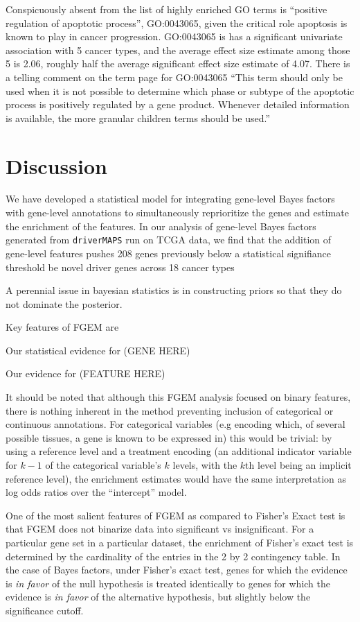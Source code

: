Conspicuously absent from the list of highly enriched GO terms is ``positive regulation of apoptotic process'', GO:0043065, given the critical role apoptosis is known to play in cancer progression. GO:0043065 is has a significant univariate association with 5 cancer types, and the average effect size estimate among those 5 is 2.06, roughly half the average significant effect size estimate of 4.07. There is a telling comment on the term page for GO:0043065 ``This term should only be used when it is not possible to determine which phase or subtype of the apoptotic process is positively regulated by a gene product. Whenever detailed information is available, the more granular children terms should be used.''

\section{Discussion}\label{sec:org3165b14}

We have developed a statistical model for integrating gene-level Bayes factors with gene-level annotations to simultaneously reprioritize the genes and estimate the enrichment of the features. In our analysis of gene-level Bayes factors generated from \texttt{driverMAPS} run on TCGA data, we find that the addition of gene-level features pushes 208 genes previously below a statistical signifiance threshold be novel driver genes across 18 cancer types


A perennial issue in bayesian statistics is in constructing priors so that they do not dominate the posterior.

Key features of FGEM are

Our statistical evidence for (GENE HERE)

Our evidence for (FEATURE HERE)

It should be noted that although this FGEM analysis focused on binary features, there is nothing inherent in the method preventing inclusion of categorical or continuous annotations.  For categorical variables (e.g encoding which, of several possible tissues, a gene is known to be expressed in) this would be
trivial: by using a reference level \cite{chambers1992statistical} and a treatment encoding (an additional indicator variable for $k-1$ of the categorical variable's $k$ levels, with the $k$th level being an implicit reference level), the enrichment estimates would have the same interpretation as log odds ratios over the ``intercept'' model.

One of the most salient features of FGEM as compared to Fisher's Exact test is that FGEM does not binarize data into significant vs insignificant.  For a particular gene set in a particular dataset, the enrichment of Fisher's exact test is determined by the cardinality of the entries in the 2 by 2 contingency table.  In the case of Bayes factors, under Fisher's exact test, genes for which the evidence is \emph{in favor} of the null hypothesis is treated identically to genes for which the evidence is \emph{in favor} of the alternative hypothesis, but slightly below the significance cutoff. 




